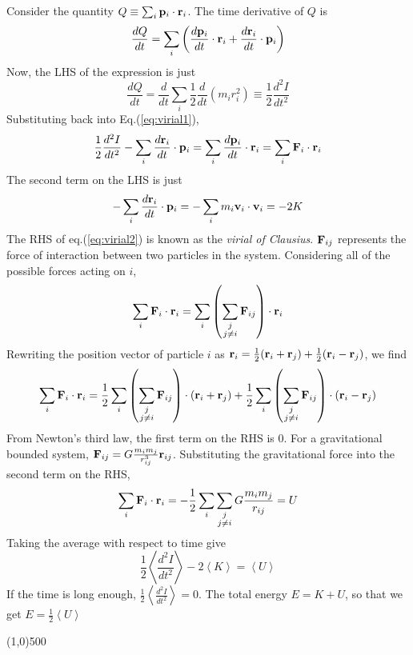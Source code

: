 \documentclass{article}
\numberwithin{equation}{section}
\numberwithin{figure}{section}
\newcommand{\hr}{\begin{center} \line(1,0){500} \end{center}}
\begin{document}
	Consider the quantity $Q\equiv\sum_i {\bf p}_i\cdot{\bf r}_i$. The time derivative of $Q$ is
	\begin{equation}\label{eq:virial1}
		\frac{dQ}{dt} = \sum_i\left(\frac{d{\bf p}_i}{dt}\cdot{\bf r}_i+\frac{d{\bf r}_i}{dt}\cdot{\bf p}_i\right) 
	\end{equation}
	Now, the LHS of the expression is just
	\begin{equation}
		\frac{dQ}{dt} = \frac{d}{dt}\sum_i\frac{1}{2}\frac{d}{dt}\left( m_ir_i^2\right) \equiv \frac{1}{2}\frac{d^2I}{dt^2}
	\end{equation}
	Substituting back into Eq.(\ref{eq:virial1}),
	\begin{equation}\label{eq:virial2}
		\frac{1}{2}\frac{d^2I}{dt^2} - \sum_i\frac{d{\bf r}_i}{dt}\cdot{\bf p}_i = \sum_i\frac{d{\bf p}_i}{dt}\cdot{\bf r}_i = \sum_i{\bf F}_i\cdot{\bf r}_i
	\end{equation}
	The second term on the LHS is just
	\begin{equation}
		-\sum_i\frac{d{\bf r}_i}{dt}\cdot{\bf p}_i = -\sum_im_i{\bf v}_i\cdot{\bf v}_i = -2K
	\end{equation}
	The RHS of eq.(\ref{eq:virial2}) is known as the {\it virial of Clausius}. ${\bf F}_{ij}$ represents the force of interaction between two particles in the system. Considering all of the possible forces acting on $i$,
	\begin{equation}
		\sum_i{\bf F}_i\cdot{\bf r}_i = \sum_i\left(\sum_{\substack{j\\j\neq i}}{\bf F}_{ij}\right)\cdot{\bf r}_i
	\end{equation}
	Rewriting the position vector of particle $i$ as ${\bf r}_i = \frac{1}{2}({\bf r}_i + {\bf r}_j) + \frac{1}{2}({\bf r}_i - {\bf r}_j)$, we find
	\begin{equation}
		\sum_i{\bf F}_i\cdot{\bf r}_i = \frac{1}{2}\sum_i\left(\sum_{\substack{j\\j\neq i}}{\bf F}_{ij}\right)\cdot({\bf r}_i + {\bf r}_j) + \frac{1}{2}\sum_i\left(\sum_{\substack{j\\j\neq i}}{\bf F}_{ij}\right)\cdot({\bf r}_i - {\bf r}_j)
	\end{equation}
	From Newton's third law, the first term on the RHS is 0. For a gravitational bounded system, ${\bf F}_{ij} = G\frac{m_im_j}{r_{ij}^3}{\bf r}_{ij}$. Substituting the gravitational force into the second term on the RHS,
	\begin{equation}
		\sum_i{\bf F}_i\cdot{\bf r}_i = -\frac{1}{2}\sum_i\sum_{\substack{j\\j\neq i}}G\frac{m_im_j}{r_{ij}} = U
	\end{equation}
	Taking the average with respect to time give
	\begin{equation}
		\frac{1}{2}\left\langle\frac{d^2I}{dt^2}\right\rangle - 2\left\langle K\right\rangle  = \left\langle U\right\rangle 
	\end{equation}
	If the time is long enough, $\frac{1}{2}\left\langle\frac{d^2I}{dt^2}\right\rangle = 0$. The total energy $E = K+U$, so that we get $E = \frac{1}{2}\left\langle U\right\rangle$
	\hr
	
\end{document}
